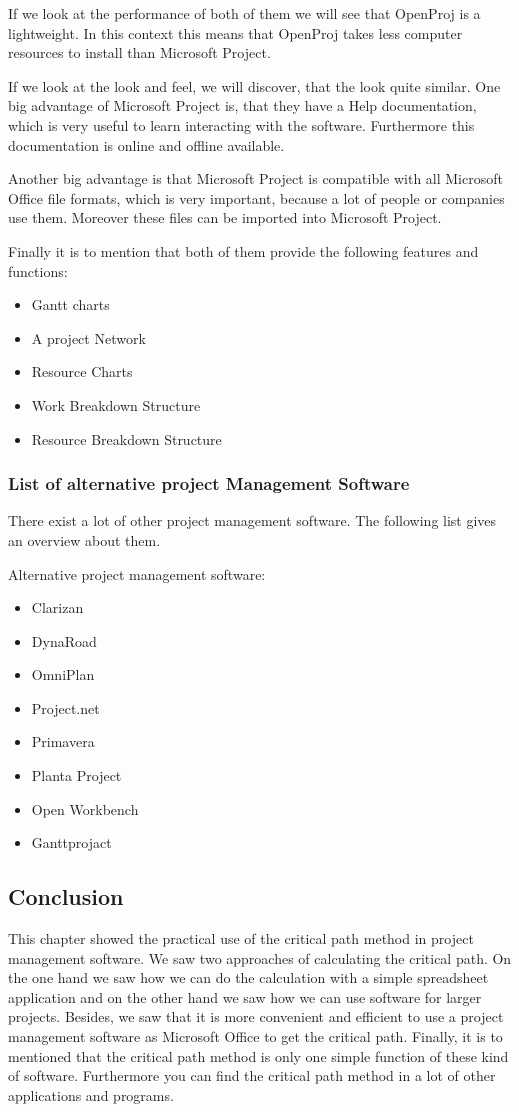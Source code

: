 If we look at the performance of both of them we will see that OpenProj is a lightweight. In this context this means that OpenProj takes less computer resources to install than Microsoft Project.

If we look at the look and feel, we will discover, that the look quite similar. One big advantage of Microsoft Project is, that they have a Help documentation, which is very useful to learn interacting with the software. Furthermore this documentation is online and offline available.

Another big advantage is that Microsoft Project is compatible with all Microsoft Office file formats, which is very important, because a lot of people or companies use them. Moreover these files can be imported into Microsoft Project.

Finally it is to mention that both of them provide the following features and functions:
\begin{itemize}
\item Gantt charts
\item A project Network
\item Resource Charts
\item Work Breakdown Structure
\item Resource Breakdown Structure
\end{itemize}
\subsubsection{List of alternative project Management Software}
There exist a lot of other project management software. The following list gives an overview about them.

Alternative project management software:
\begin{itemize}
\item Clarizan
\item DynaRoad
\item OmniPlan
\item Project.net
\item Primavera
\item Planta Project
\item Open Workbench
\item Ganttprojact
\end{itemize}

\subsection{Conclusion} 
This chapter showed the practical use of the critical path method in project management software. We saw two approaches of calculating the critical path. On the one hand we saw how we can do the calculation with a simple spreadsheet application and on the other hand we saw how we can use software for larger projects. Besides, we saw that it is more convenient and efficient to use a project management software as Microsoft Office to get the critical path. Finally, it is to mentioned that the critical path method is only one simple function of these kind of software. Furthermore you can find the critical path method in a lot of other applications and programs.

